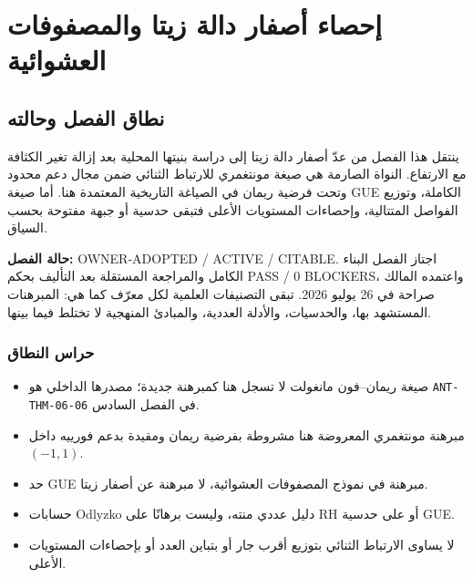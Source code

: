 \chapter{إحصاء أصفار دالة زيتا والمصفوفات العشوائية}
\label{ch:zero-statistics-random-matrices}

\section*{نطاق الفصل وحالته}

ينتقل هذا الفصل من عدّ أصفار دالة زيتا إلى دراسة بنيتها المحلية بعد إزالة تغير الكثافة مع الارتفاع. النواة الصارمة هي صيغة مونتغمري للارتباط الثنائي ضمن مجال دعم محدود وتحت فرضية ريمان في الصياغة التاريخية المعتمدة هنا. أما صيغة GUE الكاملة، وتوزيع الفواصل المتتالية، وإحصاءات المستويات الأعلى فتبقى حدسية أو جبهة مفتوحة بحسب السياق.

\noindent\textbf{حالة الفصل:}
\textenglish{OWNER-ADOPTED / ACTIVE / CITABLE}. اجتاز الفصل البناء الكامل والمراجعة المستقلة بعد التأليف بحكم \textenglish{PASS / 0 BLOCKERS}، واعتمده المالك صراحة في 26 يوليو 2026. تبقى التصنيفات العلمية لكل معرّف كما هي: المبرهنات المستشهد بها، والحدسيات، والأدلة العددية، والمبادئ المنهجية لا تختلط فيما بينها.

\subsection*{حراس النطاق}
\begin{itemize}
  \item صيغة ريمان--فون مانغولت لا تسجل هنا كمبرهنة جديدة؛ مصدرها الداخلي هو \texttt{ANT-THM-06-06} في الفصل السادس.
  \item مبرهنة مونتغمري المعروضة هنا مشروطة بفرضية ريمان ومقيدة بدعم فورييه داخل \((-1,1)\).
  \item حد GUE مبرهنة في نموذج المصفوفات العشوائية، لا مبرهنة عن أصفار زيتا.
  \item حسابات Odlyzko دليل عددي منته، وليست برهانًا على RH أو على حدسية GUE.
  \item لا يساوى الارتباط الثنائي بتوزيع أقرب جار أو بتباين العدد أو بإحصاءات المستويات الأعلى.
\end{itemize}

